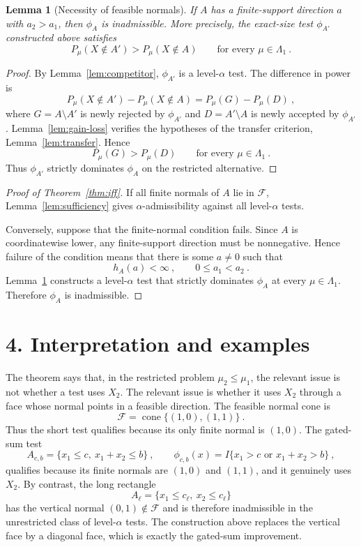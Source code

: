 \documentclass[12pt]{article}
\newtheorem{lemma}{Lemma}
\theoremstyle{remark}
\begin{document}
\begin{lemma}[Necessity of feasible normals]\label{lem:necessity}
If $A$ has a finite-support direction $a$ with $a_2>a_1$, then $\phi_A$ is inadmissible.  More precisely, the exact-size test $\phi_{A'}$ constructed above satisfies
\[
P_\mu(X\notin A')>P_\mu(X\notin A)
\qquad\text{for every }\mu\in\Lambda_1~.
\]
\end{lemma}

\begin{proof}
By Lemma~\ref{lem:competitor}, $\phi_{A'}$ is a level-$\alpha$ test.  The difference in power is
\[
P_\mu(X\notin A')-P_\mu(X\notin A)
=
P_\mu(G)-P_\mu(D)~,
\]
where $G=A\setminus A'$ is newly rejected by $\phi_{A'}$ and $D=A'\setminus A$ is newly accepted by $\phi_{A'}$.  Lemma~\ref{lem:gain-loss} verifies the hypotheses of the transfer criterion, Lemma~\ref{lem:transfer}.  Hence
\[
P_\mu(G)>P_\mu(D)
\qquad\text{for every }\mu\in\Lambda_1~.
\]
Thus $\phi_{A'}$ strictly dominates $\phi_A$ on the restricted alternative.
\end{proof}

\begin{proof}[Proof of Theorem~\ref{thm:iff}]
If all finite normals of $A$ lie in $\mathcal F$, Lemma~\ref{lem:sufficiency} gives $\alpha$-admissibility against all level-$\alpha$ tests.

Conversely, suppose that the finite-normal condition fails.  Since $A$ is coordinatewise lower, any finite-support direction must be nonnegative.  Hence failure of the condition means that there is some $a\ne0$ such that
\[
h_A(a)<\infty~,
\qquad
0\le a_1<a_2~.
\]
Lemma~\ref{lem:necessity} constructs a level-$\alpha$ test that strictly dominates $\phi_A$ at every $\mu\in\Lambda_1$.  Therefore $\phi_A$ is inadmissible.
\end{proof}

\section*{4. Interpretation and examples}

The theorem says that, in the restricted problem $\mu_2\le\mu_1$, the relevant issue is not whether a test uses $X_2$.  The relevant issue is whether it uses $X_2$ through a face whose normal points in a feasible direction.  The feasible normal cone is
\[
\mathcal F=\operatorname{cone}\{(1,0),(1,1)\}~.
\]
Thus the short test qualifies because its only finite normal is $(1,0)$.  The gated-sum test
\[
A_{c,b}=\{x_1\le c,\ x_1+x_2\le b\}~,
\qquad
\phi_{c,b}(x)=I\{x_1>c\text{ or }x_1+x_2>b\}~,
\]
qualifies because its finite normals are $(1,0)$ and $(1,1)$, and it genuinely uses $X_2$.  By contrast, the long rectangle
\[
A_\ell=\{x_1\le c_\ell,
          \ x_2\le c_\ell\}
\]
has the vertical normal $(0,1)\notin\mathcal F$ and is therefore inadmissible in the unrestricted class of level-$\alpha$ tests.  The construction above replaces the vertical face by a diagonal face, which is exactly the gated-sum improvement.
\end{document}
